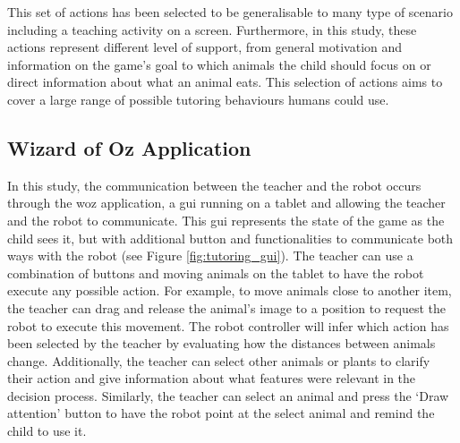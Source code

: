 This set of actions has been selected to be generalisable to many type of scenario including a teaching activity on a screen. Furthermore, in this study, these actions represent different level of support, from general motivation and information on the game's goal to which animals the child should focus on or direct information about what an animal eats. This selection of actions aims to cover a large range of possible tutoring behaviours humans could use. 

\subsection{Wizard of Oz Application}

In this study, the communication between the teacher and the robot occurs through the \gls{woz} application, a \gls{gui} running on a tablet and allowing the teacher and the robot to communicate. This \gls{gui} represents the state of the game as the child sees it, but with additional button and functionalities to communicate both ways with the robot (see Figure \ref{fig:tutoring_gui}). The teacher can use a combination of buttons and moving animals on the tablet to have the robot execute any possible action. For example, to move animals close to another item, the teacher can drag and release the animal's image to a position to request the robot to execute this movement. The robot controller will infer which action has been selected by the teacher by evaluating how the distances between animals change. Additionally, the teacher can select other animals or plants to clarify their action and give information about what features were relevant in the decision process. Similarly, the teacher can select an animal and press the `Draw attention' button to have the robot point at the select animal and remind the child to use it.
